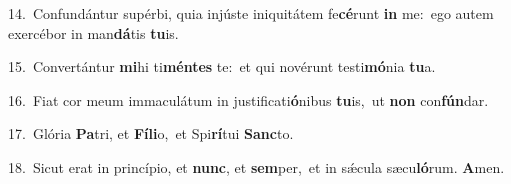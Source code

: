 {\numbfont\textcolor{\numbcolor}{14.}}~Confundántur supérbi, quia injúste iniquitátem fe\-\textbf{cé}\-runt \textbf{in} me:~\star ego autem exercébor in man\-\textbf{dá}\-tis \textbf{tu}\-is.\par
{\numbfont\textcolor{\numbcolor}{15.}}~Convertántur \textbf{mi}\-hi ti\-\textbf{mén}\-\textbf{tes} te:~\star et qui novérunt testi\-\textbf{mó}\-nia \textbf{tu}\-a.\par
{\numbfont\textcolor{\numbcolor}{16.}}~Fiat cor meum immaculátum in justificati\-\textbf{ó}\-nibus \textbf{tu}\-is,~\star ut \textbf{non} con\-\textbf{fún}\-dar.\par
{\numbfont\textcolor{\numbcolor}{17.}}~Glória \textbf{Pa}\-tri, et \textbf{Fí}\-\textbf{li}o,~\star et Spi\-\textbf{rí}\-tui \textbf{Sanc}\-to.\par
{\numbfont\textcolor{\numbcolor}{18.}}~Sicut erat in princípio, et \textbf{nunc}\-, et \textbf{sem}\-per,~\star et in sǽcula sæcu\-\textbf{ló}\-rum. \textbf{A}\-men.\par
